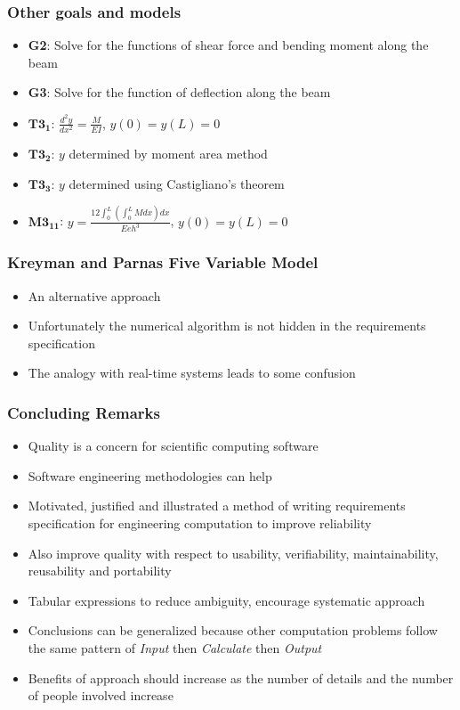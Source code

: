 \documentclass[t,12pt,numbers,fleqn]{beamer}
\begin{document}

\begin{frame}
\frametitle{Other goals and models}
\begin{itemize}
\item \textbf{G2}: Solve for the functions of shear force and bending moment along the beam
\item \textbf{G3}: Solve for the function of deflection along the beam
\item $\mathbf{T3_1}$: $\frac{d^2 y}{d x^2} = \frac{M}{EI}$, $y(0) = y(L) = 0$
\item $\mathbf{T3_2}$: $y$ determined by moment area method
\item $\mathbf{T3_3}$: $y$ determined using Castigliano's theorem
\item $\mathbf{M3_{11}}$: $y = \frac{12 \int_0^L (\int_0^L M dx) dx}{Eeh^3}$, $y(0) = y(L) = 0$
\end{itemize}
\end{frame}


\begin{frame}
\frametitle{Kreyman and Parnas Five Variable Model}
\begin{itemize}
\item An alternative approach
\item Unfortunately the numerical algorithm is not hidden in the requirements specification
\item The analogy with real-time systems leads to some confusion
\end{itemize}
\end{frame}


\begin{frame}
\frametitle{Concluding Remarks}
\begin{itemize}
\item Quality is a concern for scientific computing software
\item Software engineering methodologies can help
\item Motivated, justified and illustrated a method of writing requirements specification for engineering computation
to improve reliability
\item Also improve quality with respect to usability, verifiability, maintainability, reusability and portability
\item Tabular expressions to reduce ambiguity, encourage systematic approach
\item Conclusions can be generalized because other computation problems follow the same pattern of \emph{Input} then
\emph{Calculate} then \emph{Output}
\item Benefits of approach should increase as the number of details and the number of people involved increase
\end{itemize}
\end{frame}
\end{document}
